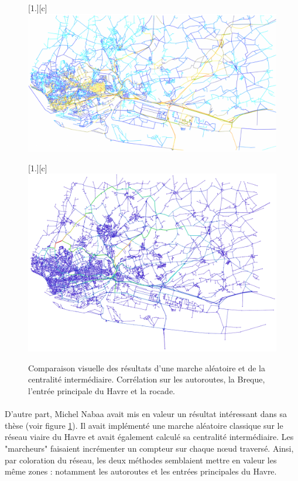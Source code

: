 \documentclass[a4paper, 10pt]{report}
\begin{document}
\begin{figure}[h!]
  \centering
  [1.\linewidth][c]{
    \includegraphics[width=1.\linewidth]{./img/marche_aleatoire_Nabaa_LeHavre.png}
  }

   [1.\linewidth][c]{
    \includegraphics[width=1.\linewidth]{./img/centralite_inter_noweight_Le_Havre.pdf}
  }
  \caption{Comparaison visuelle des résultats d'une marche aléatoire et de la centralité intermédiaire. Corrélation sur les autoroutes, la Breque, l'entrée principale du Havre et la rocade.}
  \label{fig:comparaison_centralite_marche_aleatoire_nabaa}
\end{figure}

\paragraph{}D'autre part, Michel Nabaa avait mis en valeur un résultat intéressant dans sa thèse \cite{Nabaa2011Morphodyn} (voir figure \ref{fig:comparaison_centralite_marche_aleatoire_nabaa}). Il avait implémenté une marche aléatoire classique sur le réseau viaire du Havre et avait également calculé sa centralité intermédiaire. Les "marcheurs" faisaient incrémenter un compteur sur chaque n\oe ud traversé. Ainsi, par coloration du réseau, les deux méthodes semblaient mettre en valeur les même zones : notamment les autoroutes et les entrées principales du Havre.
\end{document}
